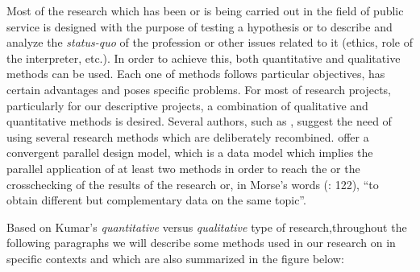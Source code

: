 \documentclass[output=paper]{LSP/langsci}
\begin{document}
Most of the research which has been or is being carried out in the field of public service  is designed with the purpose of testing a hypothesis or to describe and analyze the \textit{status-quo} of the profession or other issues related to it (ethics, role of the interpreter, etc.). In order to achieve this, both quantitative and qualitative methods can be used. Each one of methods follows particular objectives, has certain advantages and poses specific problems. For most of research projects, particularly for our descriptive projects, a combination of qualitative and quantitative methods is desired. Several authors, such as \citet{Krolokke2006}, suggest the need of using several research methods which are deliberately recombined. \citet{Creswell2011} offer a convergent parallel design model, which is a data  model which implies the parallel application of at least two methods in order to reach the  \citep{Denzin1989} or the crosschecking \citep{Douglas1976} of the results of the research or, in Morse's words (\citeyear{Morse1991}: 122), ``to obtain different but complementary data on the same topic''. 

Based on Kumar's \citeyearpar{Kumar2008} \textit{quantitative} versus \textit{qualitative} type of research,\linebreak throughout the following paragraphs we will describe some methods used in our research on  in specific contexts and which are also summarized in the figure below:
\end{document}
